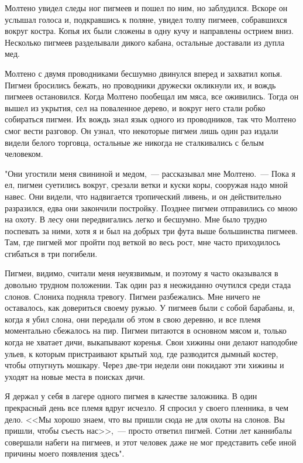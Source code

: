 \documentclass[12pt,a4paper,twoside,openany,svgnames]{memoir}
\begin{document}
Молтено увидел следы ног пигмеев и пошел по ним, но заблудился. Вскоре он услышал голоса и, подкравшись к поляне, увидел толпу пигмеев, собравшихся вокруг костра. Копья их были сложены в одну кучу и направлены острием вниз. Несколько пигмеев разделывали дикого кабана, остальные доставали из дупла мед.

Молтено с двумя проводниками бесшумно двинулся вперед и захватил копья. Пигмеи бросились бежать, но проводники дружески окликнули их, и вождь пигмеев остановился. Когда Молтено пообещал им мяса, все оживились. Тогда он вышел из укрытия, сел на поваленное дерево, и вокруг него стали робко собираться пигмеи. Их вождь знал язык одного из проводников, так что Молтено смог вести разговор. Он узнал, что некоторые пигмеи лишь один раз издали видели белого торговца, остальные же никогда не сталкивались с белым человеком.

"Они угостили меня свининой и медом,~--- рассказывал мне Молтено.~--- Пока я ел, пигмеи суетились вокруг, срезали ветки и куски коры, сооружая надо мной навес. Они видели, что надвигается тропический ливень, и он действительно разразился, едва они закончили постройку. Позднее пигмеи отправились со мною на охоту. В лесу они передвигались легко и бесшумно. Мне было трудно поспевать за ними, хотя я и был на добрых три фута выше большинства пигмеев. Там, где пигмей мог пройти под веткой во весь рост, мне часто приходилось сгибаться в три погибели.

Пигмеи, видимо, считали меня неуязвимым, и поэтому я часто оказывался в довольно трудном положении. Так один раз я неожиданно очутился среди стада слонов. Слониха подняла тревогу. Пигмеи разбежались. Мне ничего не оставалось, как довериться своему ружью. У пигмеев были с собой барабаны, и, когда я убил слона, они передали об этом в свою деревню, и все племя моментально сбежалось на пир. Пигмеи питаются в основном мясом и, только когда не хватает дичи, выкапывают коренья. Свои хижины они делают наподобие ульев, к которым пристраивают крытый ход, где разводится дымный костер, чтобы отпугнуть мошкару. Через две-три недели они покидают эти хижины и уходят на новые места в поисках дичи.

Я держал у себя в лагере одного пигмея в качестве заложника. В один прекрасный день все племя вдруг исчезло. Я спросил у своего пленника, в чем дело. <<Мы хорошо знаем, что вы пришли сюда не для охоты на слонов. Вы пришли, чтобы съесть нас>>,~--- просто ответил пигмей. Сотни лет каннибалы совершали набеги на пигмеев, и этот человек даже не мог представить себе иной причины моего появления здесь".
\end{document}
